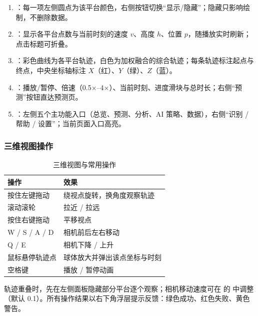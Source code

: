 \begin{enumerate}
  \item {}：每一项左侧圆点为该平台颜色，右侧按钮切换“显示/隐藏”；隐藏只影响绘制，不删除数据。
  \item {}：显示各平台点数与当前时刻的速度 $v$、高度 $h$、位置 $p$，随播放实时刷新；点击标题可折叠。
  \item {}：彩色曲线为各平台轨迹，白色为加权融合的综合轨迹；每条轨迹标注起点与终点，中央坐标轴标注 $X$（红）、$Y$（绿）、$Z$（蓝）。
  \item {}：播放/暂停、倍速（0.5×--4×）、当前时刻、进度滑块与总时长；右侧“预测”按钮直达预测页。
  \item {}：左侧五个主功能入口（总览、预测、分析、AI 策略、数据），右侧“识别 / 帮助 / 设置”；当前页面入口高亮。
\end{enumerate}

\subsubsection{三维视图操作}

\begin{table}[H]
\centering
\caption{三维视图与常用操作}
\label{tab:use_ops}
\small
\begin{tabularx}{\linewidth}{@{}>{\heiti}p{4.0cm}>{\raggedright\arraybackslash}X@{}}
\toprule
操作 & 效果 \\
\midrule
按住左键拖动 & 绕视点旋转，换角度观察轨迹 \\
滚动滚轮 & 拉近 / 拉远 \\
按住右键拖动 & 平移视点 \\
W / S / A / D & 相机前后左右移动 \\
Q / E & 相机下降 / 上升 \\
鼠标悬停轨迹点 & 球体放大并弹出该点坐标与时刻 \\
空格键 & 播放 / 暂停动画 \\
\bottomrule
\end{tabularx}
\end{table}

\begin{notebox}[两个实用技巧]
轨迹重叠时，先在左侧面板隐藏部分平台逐个观察；相机移动速度可在  的  中调整（默认 0.1）。所有操作结果以右下角浮层提示反馈：绿色成功、红色失败、黄色警告。
\end{notebox}

